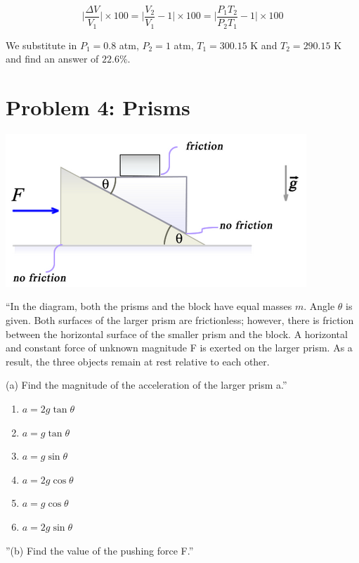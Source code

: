 \documentclass[8.01x]{subfiles}
\begin{document}
\begin{equation}
\Big| \frac{\Delta V}{V_1} \Big| \times 100 = \Big| \frac{V_2}{V_1} - 1\Big| \times 100 = \Big| \frac{P_1 T_2}{P_2 T_1} - 1\Big| \times 100
\end{equation}

We substitute in $P_1 = 0.8$ atm, $P_2 = 1$ atm, $T_1 = 300.15$ K and $T_2 = 290.15$ K and find an answer of $22.6\%$.

\section{Problem 4: Prisms}

\begin{center}
\includegraphics[scale=0.65]{Graphics/finalexam_p4}
\end{center}

``In the diagram, both the prisms and the block have equal masses $m$. Angle $\theta$ is given. Both surfaces of the larger prism are frictionless; however, there is friction between the horizontal surface of the smaller prism and the block. A horizontal and constant force of unknown magnitude F is exerted on the larger prism. As a result, the three objects remain at rest relative to each other.

(a) Find the magnitude of the acceleration of the larger prism a.''

\begin{enumerate}
\item $a = 2 g \tan \theta$
\item $a = g \tan \theta$
\item $a = g \sin \theta$
\item $a = 2 g \cos \theta$
\item $a = g \cos \theta$
\item $a = 2g \sin \theta$
\end{enumerate}

''(b) Find the value of the pushing force F.''
\end{document}
